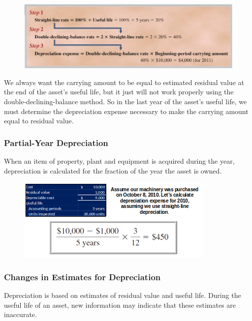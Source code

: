 \documentclass[../main.tex]{subfiles}
\begin{document}
	\begin{figure}[ht!]
		\centering		
		\includegraphics[width=1\columnwidth]{images/c8/ddb_method.png}
	\end{figure}

	We always want the carrying amount to be equal to estimated residual value 
	at the end of the asset’s useful life, but it just will not work properly 
	using the double-declining-balance method. So in the last year of the 
	asset’s useful life, we must determine the depreciation expense necessary 
	to make the carrying amount equal to residual value.

	\subsubsection{Partial-Year Depreciation}
	
	When an item of property, plant and equipment is acquired during the year, 
	depreciation is calculated for the fraction of the year the asset is owned.
	
	\begin{figure}[ht]
		\centering
		\includegraphics[width=\columnwidth]{images/c8/partial_year_depreciation.png}
	\end{figure}
	
	\subsubsection{Changes in Estimates for Depreciation}
	
	Depreciation is based on estimates of residual value and useful life. 
	During the useful life of an asset, new information may indicate that these 
	estimates are inaccurate.
\end{document}
